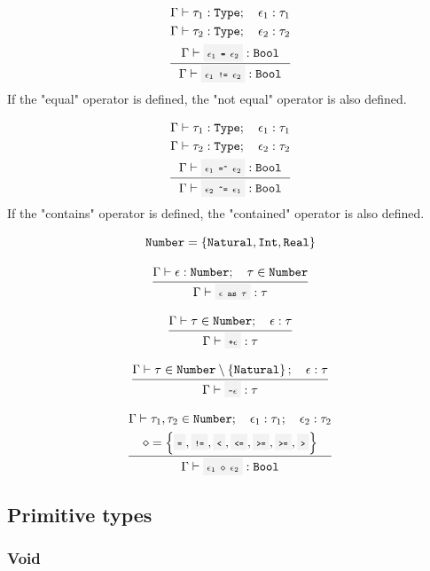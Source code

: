 \[
	\infrule{
		\EnvSym\then \tau_1:\Type \semiq \expr_1:\tau_1 \\*
		\EnvSym\then \tau_2:\Type \semiq \expr_2:\tau_2 \\*
		\EnvSym\then \code{$\expr_1$ = $\expr_2$} : \Bool
	}{
		\EnvSym\then \code{$\expr_1$ != $\expr_2$} : \Bool
	}
\]
If the "equal" operator is defined, the "not equal" operator is also defined.

\vspace{\baselineskip}

\[
	\infrule{
		\EnvSym\then \tau_1:\Type \semiq \expr_1:\tau_1 \\*
		\EnvSym\then \tau_2:\Type \semiq \expr_2:\tau_2 \\*
		\EnvSym\then \code{$\expr_1$ =\~{} $\expr_2$}: \Bool
	}{
		\EnvSym\then \code{$\expr_2$ \~{}= $\expr_1$}: \Bool
	}
\]
If the "contains" operator is defined, the "contained" operator is also
defined.

\vspace{\baselineskip}

\[
	\texttt{Number} = \left\{\texttt{Natural}, \texttt{Int}, \texttt{Real}\right\}
\]

\[
	\infrule{
		\EnvSym\then \expr:\Number \semiq \tau \in \Number
	}{
		\EnvSym\then \code{$\expr$ as $\tau$}: \tau
	}
\]


\[
	\infrule{
		\EnvSym\then \tau \in \Number \semiq \expr:\tau
	}{
		\EnvSym\then \code{+$\expr$}: \tau
	}
\]

\[
	\infrule{
		\EnvSym\then \tau \in \Number\setminus\set{\Natural} \semiq \expr:\tau
	}{
		\EnvSym\then \code{-$\expr$}: \tau
	}
\]

\[
	\infrule{
		\EnvSym\then \tau_1,\tau_2 \in \Number \semiq \expr_1:\tau_1 \semiq \expr_2:\tau_2\\*
		\bop = \set{\code{=}, \code{!=}, \code{<}, \code{<=}, \code{>=}, \code{>=}, \code{>}}
	}{
		\EnvSym\then \code{$\expr_1$ $\bop$ $\expr_2$}: \Bool
	}
\]

\clearpage

\subsection{Primitive types}

\subsubsection{Void}

